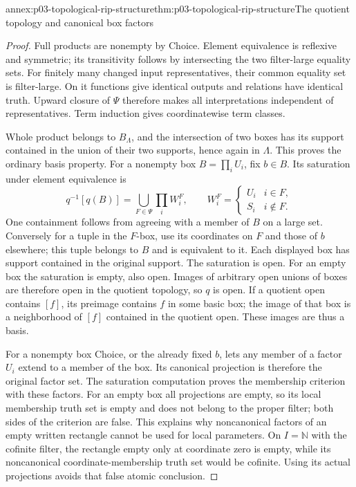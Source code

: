 \begin{annexitem}{annex:p03-topological-rip-structure}{thm:p03-topological-rip-structure}{The quotient topology and canonical box factors}
\begin{proof}
Full products are nonempty by Choice. Element equivalence is reflexive
and symmetric; its transitivity follows by intersecting the two filter-large
equality sets. For finitely many changed input representatives, their common
equality set is filter-large. On it functions give identical outputs and
relations have identical truth. Upward closure of \(\Psi\) therefore
makes all interpretations independent of representatives. Term induction
gives coordinatewise term classes.

Whole product belongs to \(B_\Lambda\), and the intersection of two
boxes has its support contained in the union of their two supports, hence
again in \(\Lambda\). This proves the ordinary basis property.
For a nonempty box \(B=\prod_i U_i\), fix \(b\in B\).
Its saturation under element equivalence is
\[
 q^{-1}[q(B)]=\bigcup_{F\in\Psi}\prod_i W_i^F,
 \qquad W_i^F=\begin{cases}U_i&i\in F,\\S_i&i\notin F.\end{cases}
\]
One containment follows from agreeing with a member of \(B\) on a
large set. Conversely for a tuple in the \(F\)-box, use its coordinates
on \(F\) and those of \(b\) elsewhere; this tuple belongs to \(B\)
and is equivalent to it. Each displayed box has support contained in the
original support. The saturation is open. For an empty box the saturation
is empty, also open. Images of arbitrary open unions of boxes are therefore
open in the quotient topology, so \(q\) is open. If a quotient open
contains \([f]\), its preimage contains \(f\) in some basic box;
the image of that box is a neighborhood of \([f]\) contained in the
quotient open. These images are thus a basis.

For a nonempty box Choice, or the already fixed \(b\), lets any member
of a factor \(U_i\) extend to a member of the box. Its canonical
projection is therefore the original factor set. The saturation computation
proves the membership criterion with these factors. For an empty box all
projections are empty, so its local membership truth set is empty and
does not belong to the proper filter; both sides of the criterion are false.
This explains why noncanonical factors of an empty written rectangle cannot
be used for local parameters. On \(I=\mathbb N\) with the cofinite
filter, the rectangle empty only at coordinate zero is empty, while its
noncanonical coordinate-membership truth set would be cofinite. Using its
actual projections avoids that false atomic conclusion.


\end{proof}
\end{annexitem}
